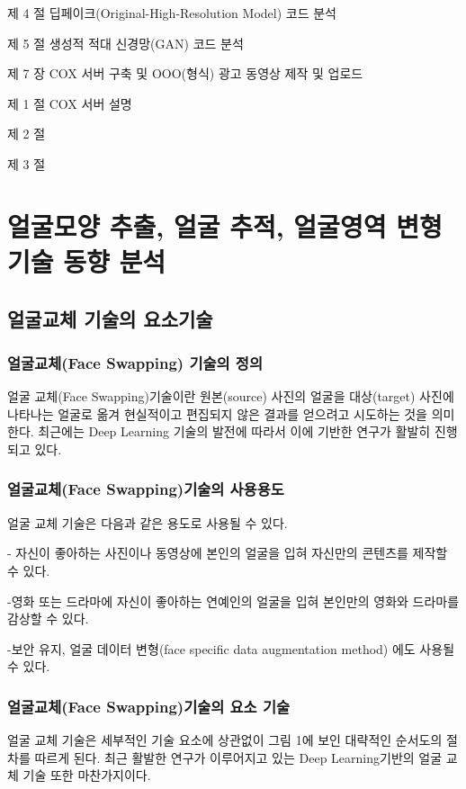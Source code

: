 \documentclass{oblivoir}
\begin{document}
  제  4  절 딥페이크(Original-High-Resolution Model) 코드 분석

  제  5  절 생성적 적대 신경망(GAN) 코드 분석

제  7  장 COX 서버 구축 및 OOO(형식) 광고 동영상 제작 및 업로드

  제  1  절 COX 서버 설명

  제  2  절 

  제  3  절 

\chapter{얼굴모양 추출, 얼굴 추적, 얼굴영역 변형 기술 동향 분석 }

\section{얼굴교체 기술의 요소기술}

\subsection{ 얼굴교체(Face Swapping) 기술의 정의}

얼굴 교체(Face Swapping)기술이란 원본(source) 사진의 얼굴을 대상(target) 사진에 나타나는 얼굴로 옮겨 현실적이고 편집되지 않은 결과를 얻으려고 시도하는 것을 의미한다. 최근에는 Deep Learning 기술의 발전에 따라서 이에 기반한 연구가 활발히 진행되고 있다.

\subsection{ 얼굴교체(Face Swapping)기술의 사용용도}

얼굴 교체 기술은 다음과 같은 용도로 사용될 수 있다.

- 자신이 좋아하는 사진이나 동영상에 본인의 얼굴을 입혀 자신만의 콘텐츠를 제작할 수 있다.

-영화 또는 드라마에 자신이 좋아하는 연예인의 얼굴을 입혀 본인만의 영화와 드라마를 감상할 수 있다.

-보안 유지, 얼굴 데이터 변형(face specific data augmentation method) 에도 사용될 수 있다.

\subsection{ 얼굴교체(Face Swapping)기술의 요소 기술}

얼굴 교체 기술은 세부적인 기술 요소에 상관없이 그림 1에 보인 대략적인 순서도의 절차를 따르게 된다. 최근 활발한 연구가 이루어지고 있는 Deep Learning기반의 얼굴 교체 기술 또한 마찬가지이다. 
\end{document}
